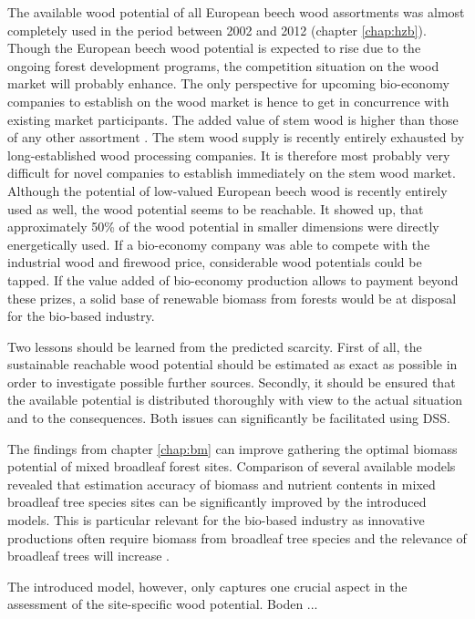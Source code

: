 The available wood potential of all European beech wood assortments was almost completely used in the period between 2002 and 2012 (chapter \ref{chap:hzb}). Though the European beech wood potential is expected to rise due to the ongoing forest development programs, the competition situation on the wood market will probably enhance. The only perspective for upcoming bio-economy companies to establish on the wood market is hence to get in concurrence with existing market participants. The added value of stem wood is higher than those of any other assortment \citep{nagel_2008}. The stem wood supply is recently entirely exhausted by long-established wood processing companies. It is therefore most probably very difficult for novel companies to establish immediately on the stem wood market. Although the potential of low-valued European beech wood is recently entirely used as well, the wood potential seems to be reachable. It showed up, that approximately 50\% of the wood potential in smaller dimensions were directly energetically used. If a bio-economy company was able to compete with the industrial wood and firewood price, considerable wood potentials could be tapped. If the value added of bio-economy production allows to payment beyond these prizes, a solid base of renewable biomass from forests would be at disposal for the bio-based industry.

Two lessons should be learned from the predicted scarcity. First of all, the sustainable reachable wood potential should be estimated as exact as possible in order to investigate possible further sources. Secondly, it should be ensured that the available potential is distributed thoroughly with view to the actual situation and to the consequences. Both issues can significantly be facilitated using DSS.

The findings from chapter \ref{chap:bm} can improve gathering the optimal biomass potential of mixed broadleaf forest sites. Comparison of several available models revealed that estimation accuracy of biomass and nutrient contents in mixed broadleaf tree species sites can be significantly improved by the introduced models. This is particular relevant for the bio-based industry as innovative productions often require biomass from broadleaf tree species \citep[p. 1]{auer_2016} and the relevance of broadleaf trees will increase \citep{ti_2014}.

The introduced model, however, only captures one crucial aspect in the assessment of the site-specific wood potential. Boden ...


